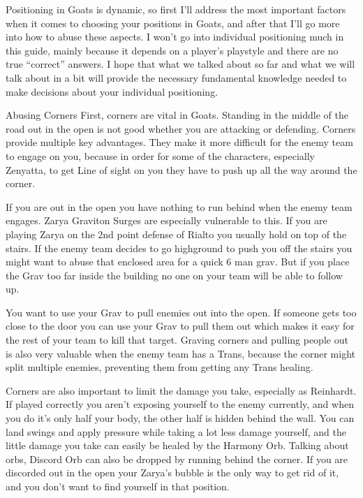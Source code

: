 Positioning in Goats is dynamic, so first I’ll address the most important factors when it comes to choosing your positions in Goats, and after that I’ll go more into how to abuse these aspects. I won’t go into individual positioning much in this guide, mainly because it depends on a player’s playstyle and there are no true “correct” answers. I hope that what we talked about so far and what we will talk about in a bit will provide the necessary fundamental knowledge needed to make decisions about your individual positioning.

Abusing Corners
First, corners are vital in Goats. Standing in the middle of the road out in the open is not good whether you are attacking or defending. Corners provide multiple key advantages. They make it more difficult for the enemy team to engage on you, because in order for some of the characters, especially Zenyatta, to get Line of sight on you they have to push up all the way around the corner.

If you are out in the open you have nothing to run behind when the enemy team engages. Zarya Graviton Surges are especially vulnerable to this. If you are playing Zarya on the 2nd point defense of Rialto you usually hold on top of the stairs. If the enemy team decides to go highground to push you off the stairs you might want to abuse that enclosed area for a quick 6 man grav. But if you place the Grav too far inside the building no one on your team will be able to follow up.

You want to use your Grav to pull enemies out into the open. If someone gets too close to the door you can use your Grav to pull them out which makes it easy for the rest of your team to kill that target. Graving corners and pulling people out is also very valuable when the enemy team has a Trans, because the corner might split multiple enemies, preventing them from getting any Trans healing. 


Corners are also important to limit the damage you take, especially as Reinhardt. If played correctly you aren’t exposing yourself to the enemy currently, and when you do it’s only half your body, the other half is hidden behind the wall. You can land swings and apply pressure while taking a lot less damage yourself, and the little damage you take can easily be healed by the Harmony Orb. Talking about orbs, Discord Orb can also be dropped by running behind the corner. If you are discorded out in the open your Zarya’s bubble is the only way to get rid of it, and you don’t want to find yourself in that position. 	

